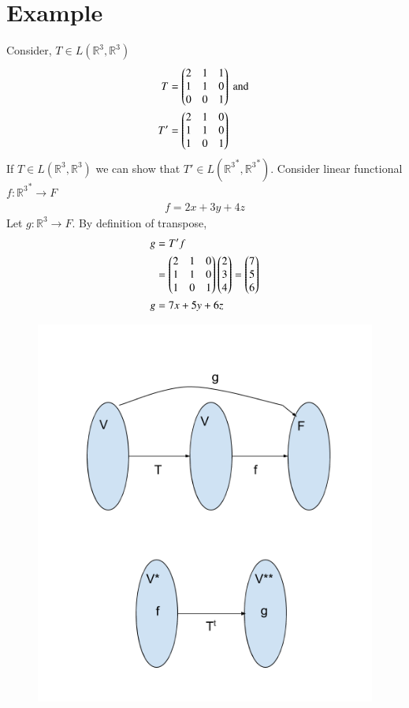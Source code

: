 \documentclass[journal,12pt,twocolumn]{IEEEtran}
\begin{document}
\section{Example}
Consider, $T \in L(\mathbb{R}^3,\mathbb{R}^3)$
\begin{align}
	T &= \begin{pmatrix}2 & 1 & 1\\ 1 & 1 & 0\\ 0 & 0 & 1\end{pmatrix} \text{ and }\\
	T' &= \begin{pmatrix}2 & 1 & 0\\1 & 1 & 0\\1 & 0 & 1\end{pmatrix}
\end{align}
If $T \in L(\mathbb{R}^3,\mathbb{R}^3)$ we can show that $T' \in L({\mathbb{R}^3}^*,{\mathbb{R}^3}^*)$. Consider linear functional $f : {\mathbb{R}^3}^* \rightarrow F$ 
\begin{align}
	f = 2x + 3y + 4z
\end{align}
Let $g : \mathbb{R}^3 \rightarrow F$. By definition of transpose,
\begin{align}
	g &= T'f\\
	&= \begin{pmatrix}2 & 1 & 0\\1 & 1 & 0\\1 & 0 & 1\end{pmatrix}\begin{pmatrix}2\\3\\4\end{pmatrix} = \begin{pmatrix}7\\5\\6\end{pmatrix}\\
	g &= 7x + 5y + 6z
\end{align}
\begin{figure}[H]
\centering
\includegraphics[width=\columnwidth]{fig/transpose_example.png}
\end{figure}
\end{document}
